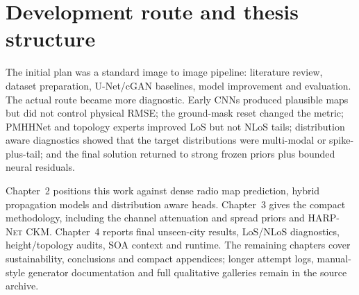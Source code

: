 \section{Development route and thesis structure}

The initial plan was a standard image to image pipeline: literature review,
dataset preparation, U-Net/cGAN baselines, model improvement and evaluation. The
actual route became more diagnostic. Early CNNs produced plausible maps but did
not control physical RMSE; the ground-mask reset changed the metric; PMHHNet and
topology experts improved LoS but not NLoS tails; distribution aware diagnostics
showed that the target distributions were multi-modal or spike-plus-tail; and
the final solution returned to strong frozen priors plus bounded neural
residuals.

Chapter~2 positions this work against dense radio map prediction, hybrid
propagation models and distribution aware heads. Chapter~3 gives the compact
methodology, including the channel attenuation and spread priors and
\textsc{HARP-Net CKM}. Chapter~4 reports final unseen-city results, LoS/NLoS diagnostics,
height/topology audits, SOA context and runtime. The remaining chapters cover
sustainability, conclusions and compact appendices; longer attempt logs,
manual-style generator documentation and full qualitative galleries remain in
the source archive.
